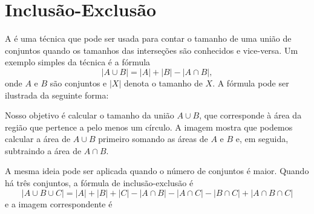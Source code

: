 \section{Inclusão-Exclusão}


A  é uma técnica
que pode ser usada para contar o tamanho
de uma união de conjuntos quando os tamanhos das
interseções são conhecidos e vice-versa.
Um exemplo simples da técnica é a fórmula
\[ |A \cup B| = |A| + |B| - |A \cap B|,\]
onde $A$ e $B$ são conjuntos e $|X|$
denota o tamanho de $X$.
A fórmula pode ser ilustrada da seguinte forma:

\begin{center}
\end{center}

Nosso objetivo é calcular
o tamanho da união $A \cup B$,
que corresponde à área da região
que pertence a pelo menos um círculo.
A imagem mostra que podemos calcular
a área de $A \cup B$ primeiro somando as
áreas de $A$ e $B$ e, em seguida, subtraindo
a área de $A \cap B$.

A mesma ideia pode ser aplicada quando o número
de conjuntos é maior.
Quando há três conjuntos, a fórmula de inclusão-exclusão é
\[ |A \cup B \cup C| = |A| + |B| + |C| - |A \cap B|  - |A \cap C|  - |B \cap C| + |A \cap B \cap C| \]
e a imagem correspondente é

\begin{center}
\end{center}

